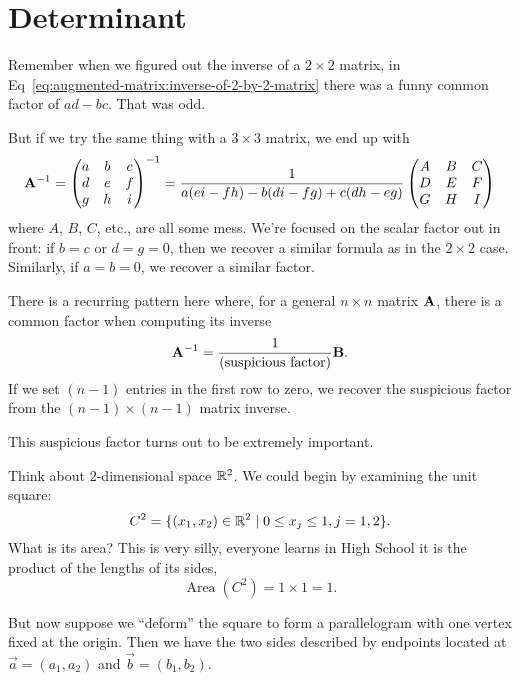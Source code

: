 \section{Determinant}

\M
Remember when we figured out the inverse of a $2\times 2$ matrix, in
Eq~\eqref{eq:augmented-matrix:inverse-of-2-by-2-matrix} there was a
funny common factor of $ad-bc$. That was odd.

But if we try the same thing with a $3\times 3$ matrix, we end up with
\begin{equation}
\mathbf{A}^{-1} = \begin{pmatrix}a & b & c\\
  d & e & f\\
  g & h & i
\end{pmatrix}^{-1} = \frac{1}{a(ei-fh)-b(di-fg)+c(dh-eg)}\begin{pmatrix}A & B & C\\
  D & E & F\\
  G & H & I
\end{pmatrix}
\end{equation}
where $A$, $B$, $C$, etc., are all some mess. We're focused on the
scalar factor out in front: if $b=c$ or $d=g=0$, then we recover a similar
formula as in the $2\times 2$ case. Similarly, if $a=b=0$, we recover a
similar factor.

There is a recurring pattern here where, for a general $n\times n$
matrix $\mathbf{A}$, there is a common factor when computing its inverse
\begin{equation}
\mathbf{A}^{-1} = \frac{1}{\mbox{(suspicious factor)}}\mathbf{B}.
\end{equation}
If we set $(n-1)$ entries in the first row to zero, we recover the
suspicious factor from the $(n-1)\times(n-1)$ matrix inverse.

This suspicious factor turns out to be extremely important.

Think about $2$-dimensional space $\mathbb{R}^{2}$. We could begin by examining
the unit square:
\begin{equation}
C^{2} = \{(x_{1},x_{2})\in\mathbb{R}^{2}\mid 0\leq x_{j}\leq 1, j=1,2\}.
\end{equation}
What is its area? This is very silly, everyone learns in High School it
is the product of the lengths of its sides,
\begin{equation}
\operatorname{Area}(C^{2})=1\times1=1.
\end{equation}

But now suppose we ``deform'' the square to form a parallelogram with
one vertex fixed at the origin. Then we have the two sides described by
endpoints located at $\vec{a}=(a_{1},a_{2})$ and
$\vec{b}=(b_{1},b_{2})$.

